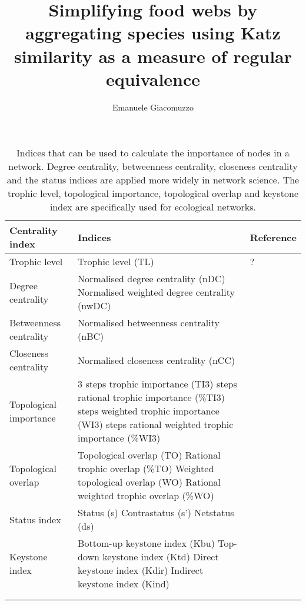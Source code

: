 \documentclass{article}
\title{Simplifying food webs by aggregating species using Katz similarity as a measure of regular equivalence}
\author{Emanuele Giacomuzzo}
\begin{document}
\maketitle


\begin{table}[htbp]
	\centering
		\begin{tabularx}{\textwidth}{ l >{\raggedright}X l }
			\hline
			Centrality index & Indices & Reference \\
			\hline
			Trophic level & Trophic level (TL) & ? \\
			Degree centrality & Normalised degree centrality (nDC) \linebreak Normalised weighted degree centrality (nwDC) & \citet{Newman2018} \\
			Betweenness centrality & Normalised betweenness centrality (nBC) & \citet{Newman2018} \\
			Closeness centrality & Normalised closeness centrality (nCC) & \citet{Newman2018} \\
			Topological importance & 3 steps trophic importance (TI3) \linebreak 3 steps rational trophic importance (\%TI3) \linebreak 3 steps weighted trophic importance (WI3) \linebreak 3 steps rational weighted trophic importance (\%WI3) & \citet{Jordan2003} \\
			Topological overlap & Topological overlap (TO) \linebreak Rational trophic overlap (\%TO) \linebreak Weighted topological overlap (WO) \linebreak Rational weighted trophic overlap (\%WO) & \citet{Jordan2003}\\
			Status index & Status (s) \linebreak Contrastatus (s') \linebreak Netstatus (ds)  & \citet{Harary1961}\\
			Keystone index & Bottom-up keystone index (Kbu) \linebreak Top-down keystone index (Ktd) \linebreak Direct keystone index (Kdir) \linebreak Indirect keystone index (Kind) & \citet{Jordan1999} \\
			\\
			\hline
	            \label{tab:centrality_indices}
	            \caption {Indices that can be used to calculate the importance of nodes in a network. Degree centrality, betweenness centrality, closeness centrality and the status indices are applied more widely in network science. The trophic level, topological importance, topological overlap and keystone index are specifically used for ecological networks.}
	   \end{tabularx}
\end{table}
\end{document}
